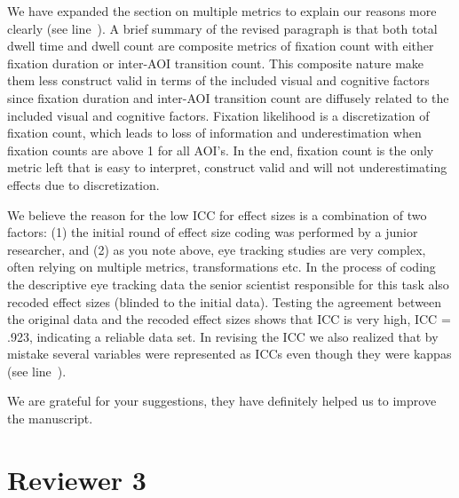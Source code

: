 
We have expanded the section on multiple metrics to explain our reasons more clearly (see line~). A brief summary of the revised paragraph is that both total dwell time and dwell count are composite metrics of fixation count with either fixation duration or inter-AOI transition count. This composite nature make them less construct valid in terms of the included visual and cognitive factors since fixation duration and inter-AOI transition count are diffusely related to the included visual and cognitive factors. Fixation likelihood is a discretization of fixation count, which leads to loss of information and underestimation when fixation counts are above 1 for all AOI's. In the end, fixation count is the only metric left that is easy to interpret, construct valid and will not underestimating effects due to discretization. 



We believe the reason for the low ICC for effect sizes is a combination of two factors: (1) the initial round of effect size coding was performed by a junior researcher, and (2) as you note above, eye tracking studies are very complex, often relying on multiple metrics, transformations etc. In the process of coding the descriptive eye tracking data the senior scientist responsible for this task also recoded effect sizes (blinded to the initial data). Testing the agreement between the original data and the recoded effect sizes shows that ICC is very high, ICC = .923, indicating a reliable data set. In revising the ICC we also realized that by mistake several variables were represented as ICCs even though they were kappas (see line~).



We are grateful for your suggestions, they have definitely helped us to improve the manuscript.




\section{Reviewer 3}
\label{rev:r3}

